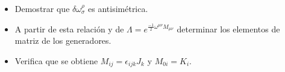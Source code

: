 \begin{itemize}
\item Demostrar que $ \delta \omega ^\rho _\sigma$ es antisimétrica.

\item A partir de esta relación y de $\Lambda =e^{\frac{-1}{2}\omega ^{\mu \nu}M_{\mu \nu}}$ determinar los elementos de matriz de los generadores.

\item Verifica que se obtiene $M_{ij}=\epsilon _{ijk}J_k$ y $M_{0i}=K_i$.
\end{itemize}

